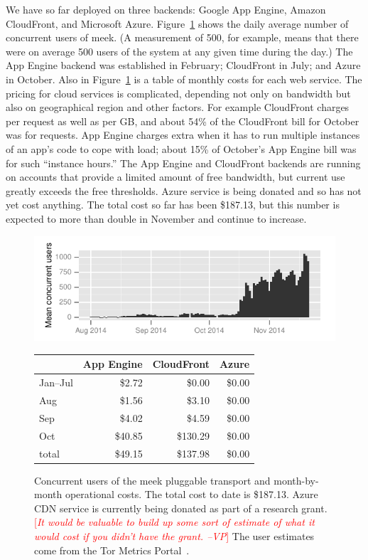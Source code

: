 \documentclass{sig-alternate}
\newcommand{\meek}{meek\xspace}
\newcommand{\note}[1]{{\textcolor{red}{[\textit{#1}]}}}
\newcommand{\vp}[1]{\note{#1 --VP}}
\begin{document}
We have so far deployed on three backends:
Google App Engine,
Amazon CloudFront,
and Microsoft Azure.
Figure~\ref{fig:clients-tor} shows the daily average number of concurrent users of \meek.
(A measurement of 500, for example, means that there were on average 500
users of the system at any given time during the day.)
The App Engine backend was established in February;
CloudFront in July;
and Azure in October.
Also in Figure~\ref{fig:clients-tor} is a table of monthly costs for each web service.
The pricing for cloud services is complicated,
depending not only on bandwidth but also on geographical region and other factors.
For example CloudFront charges per request as well as per GB,
and about 54\% of the CloudFront bill for October was for requests.
App Engine charges extra when it has to run multiple instances
of an app's code to cope with load;
about 15\% of October's App Engine bill was for such ``instance hours.''
The App Engine and CloudFront backends are running on accounts
that provide a limited amount of free bandwidth,
but current use greatly exceeds the free thresholds.
Azure service is being donated and so has not yet cost anything.
The total cost so far has been \$187.13,
but this number is expected to more than double in November and continue to increase.

\begin{figure}
\centering
\includegraphics[width=\linewidth]{clients-meek}
\begin{tabular}{l r r r}
       &App Engine &CloudFront&  Azure \\
\hline
Jan--Jul &  \$2.72 &   \$0.00 & \$0.00 \\
Aug      &  \$1.56 &   \$3.10 & \$0.00 \\
Sep      &  \$4.02 &   \$4.59 & \$0.00 \\
Oct      & \$40.85 & \$130.29 & \$0.00 \\
\hline
total    & \$49.15 & \$137.98 & \$0.00 \\
\end{tabular}
\caption{
Concurrent users of the \meek pluggable transport
and month-by-month operational costs.
The total cost to date is \$187.13.
Azure CDN service is currently being donated as part of a research grant.
\vp{It would be valuable to build up some sort of estimate of what it
would cost if you didn't have the grant.}
The user estimates come from the Tor Metrics Portal~\cite{metrics-meek,counting-daily-bridge-users}.
}
\label{fig:clients-tor}
\end{figure}
\end{document}
